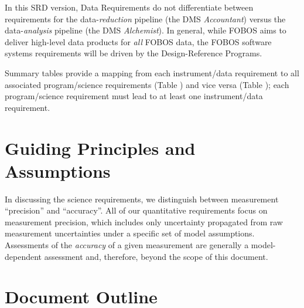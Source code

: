 \documentclass[11pt,a4paper,twoside,onecolumn,openany,final,oldfontcommands]{memoir}
\begin{document}


In this SRD version, Data Requirements do not differentiate between requirements for the data-\textit{reduction} pipeline (the DMS \textit{Accountant}) versus the data-\textit{analysis} pipeline (the DMS \textit{Alchemist}).  In general, while FOBOS aims to deliver high-level data products for \textit{all} FOBOS data, the FOBOS software systems requirements will be driven by the Design-Reference Programs.

Summary tables provide a mapping from each instrument/data requirement to all associated program/science requirements (Table ) and vice versa (Table ); each program/science requirement must lead to at least one instrument/data requirement.

\section{Guiding Principles and Assumptions}

In discussing the science requirements, we distinguish between measurement ``precision'' and ``accuracy''. All of our quantitative requirements focus on measurement precision, which includes only uncertainty propagated from raw measurement uncertainties under a specific set of model assumptions. Assessments of the \textit{accuracy} of a given measurement are generally a model-dependent assessment and, therefore, beyond the scope of this document.

\section{Document Outline}
\end{document}

